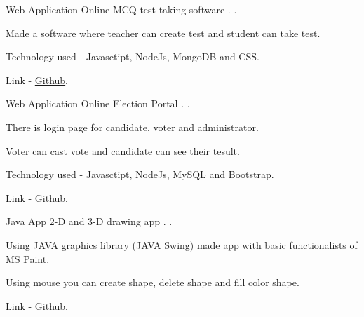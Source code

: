 \begin{cventries}
    \cventry
    {Web Application}
    {Online MCQ test taking software}
    {.}
    {.}
    {
      \begin{cvitems}
        \item {Made a software where teacher can create test and student can take test. }
        \item {Technology used - Javasctipt, NodeJs, MongoDB and CSS.}
        \item {Link -  \href{https://github.com/vikash-kr/MCQ}{Github}.}
      \end{cvitems}
    }

  \cventry
    {Web Application}
    {Online Election Portal}
    {.}
    {.}
    {
      \begin{cvitems}
        \item {There is login page for candidate, voter and administrator.}
        \item {Voter can cast vote and candidate can see their tesult.}
        \item {Technology used - Javasctipt, NodeJs, MySQL and Bootstrap.}
        \item{Link - 
            \href{https://github.com/vikash-kr/Online-Election-Portal}{Github}.}
      \end{cvitems}
    }

  \cventry
    {Java App}
    {2-D and 3-D drawing app}
    {.}
    {.}
    {
      \begin{cvitems}
        \item {Using JAVA graphics library (JAVA Swing) made app with basic functionalists of MS Paint.}
        \item {Using mouse you can create shape, delete shape and fill color shape.}
        \item{Link - 
            \href{https://github.com/vikash-kr/2D-and-3D-shape-using-JAVA-1}{Github}.}
      \end{cvitems} 
    }
\end{cventries}
